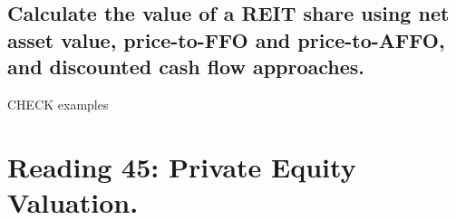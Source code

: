 \documentclass{article}
\begin{document}
\subsection{Calculate the value of a REIT share using net asset value, price-to-FFO and price-to-AFFO,
and discounted cash flow approaches.}
CHECK examples


\section{Reading 45: Private Equity Valuation.}
\end{document}
